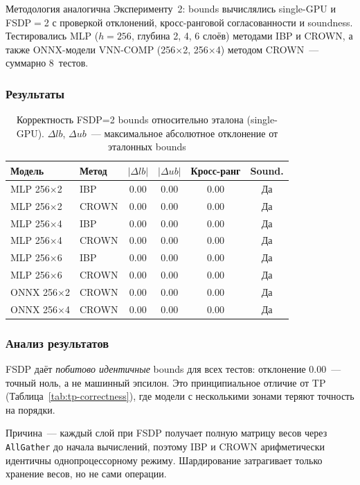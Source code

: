 Методология аналогична Эксперименту~2: bounds вычислялись
single-GPU и FSDP$=$2 с проверкой отклонений, кросс-ранговой
согласованности и soundness.
Тестировались MLP ($h = 256$, глубина 2, 4, 6 слоёв) методами
IBP и CROWN, а также ONNX-модели VNN-COMP (256$\times$2,
256$\times$4) методом CROWN~--- суммарно 8~тестов.

\subsubsection{Результаты}

\begin{table}[htbp]
\centering
\caption{Корректность FSDP=2 bounds относительно эталона
(single-GPU). $\Delta lb$, $\Delta ub$~--- максимальное абсолютное
отклонение от эталонных bounds}
\label{tab:fsdp-correctness}
\begin{tabular}{llcccc}
\toprule
Модель & Метод & $|\Delta lb|$ & $|\Delta ub|$
    & Кросс-ранг & Sound. \\
\midrule
MLP 256$\times$2 & IBP   & $0.00$ & $0.00$ & $0.00$ & Да \\
MLP 256$\times$2 & CROWN & $0.00$ & $0.00$ & $0.00$ & Да \\
MLP 256$\times$4 & IBP   & $0.00$ & $0.00$ & $0.00$ & Да \\
MLP 256$\times$4 & CROWN & $0.00$ & $0.00$ & $0.00$ & Да \\
MLP 256$\times$6 & IBP   & $0.00$ & $0.00$ & $0.00$ & Да \\
MLP 256$\times$6 & CROWN & $0.00$ & $0.00$ & $0.00$ & Да \\
ONNX 256$\times$2 & CROWN & $0.00$ & $0.00$ & $0.00$ & Да \\
ONNX 256$\times$4 & CROWN & $0.00$ & $0.00$ & $0.00$ & Да \\
\bottomrule
\end{tabular}
\end{table}

\subsubsection{Анализ результатов}

FSDP даёт \textit{побитово идентичные} bounds для всех тестов:
отклонение $0.00$~--- точный ноль, а не машинный эпсилон.
Это принципиальное отличие от TP (Таблица~\ref{tab:tp-correctness}),
где модели с несколькими зонами теряют точность на порядки.

Причина~--- каждый слой при FSDP получает полную матрицу весов
через \texttt{AllGather} до начала вычислений, поэтому IBP и CROWN
арифметически идентичны однопроцессорному режиму.
Шардирование затрагивает только хранение весов, но не сами операции.

